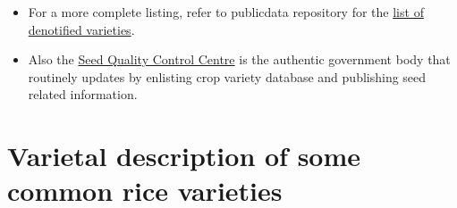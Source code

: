 \documentclass[
  openany]{book}
\providecommand{\tightlist}{%
  \setlength{\itemsep}{0pt}\setlength{\parskip}{0pt}}
\begin{document}
\begin{itemize}
\tightlist
\item
  For a more complete listing, refer to publicdata repository for the \href{https://raw.githubusercontent.com/DeependraD/publicdata/master/crop_varieties/denotified_varieties.csv}{list of denotified varieties}.
\item
  Also the \href{http://sqcc.gov.np/en}{Seed Quality Control Centre} is the authentic government body that routinely updates by enlisting crop variety database and publishing seed related information.
\end{itemize}

\hypertarget{varietal-description-of-some-common-rice-varieties}{%
\section{Varietal description of some common rice varieties}\label{varietal-description-of-some-common-rice-varieties}}
\end{document}
